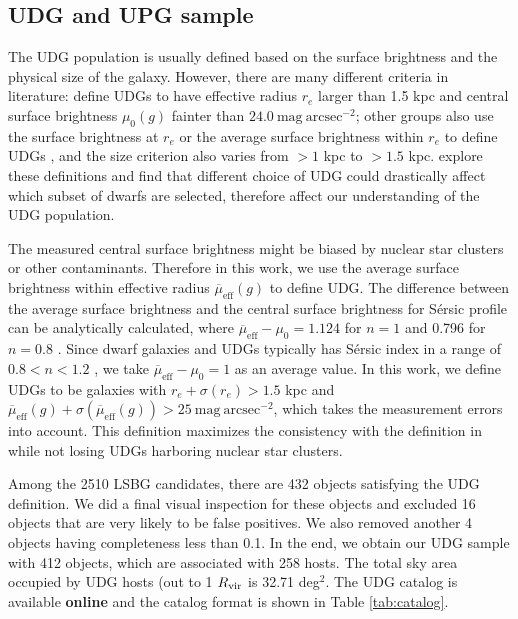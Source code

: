 \documentclass[twocolumn,astrosymb,twocolappendix]{aastex631}
\newcommand{\sbunit}{\mathrm{mag\ arcsec}^{-2}}
\newcommand{\sbeff}{\overline{\mu}_{\mathrm{eff}}(g)}
\newcommand{\sersic}{S\'ersic}
\begin{document}
\begin{CJK*}{UTF8}{gbsn}
\subsection{UDG and UPG sample}\label{sec:sample}
The UDG population is usually defined based on the surface brightness and the physical size of the galaxy. However, there are many different criteria in literature: \citep{vanDokkum2015} define UDGs to have effective radius $r_e$ larger than 1.5 kpc and central surface brightness $\mu_0(g)$ fainter than $24.0\ \sbunit$; other groups also use the surface brightness at $r_e$ \citep[e.g.,][]{DiCintio2017,Cardona-Barrero2020} or the average surface brightness within $r_e$ to define UDGs \citep[e.g.,][]{Koda2015,Yagi2016,vdBurg2016,Leisman2017,Martin2019}, and the size criterion also varies from $>1$ kpc to $>1.5$ kpc. \citet{vanNest2022} explore these definitions and find that different choice of UDG could drastically affect which subset of dwarfs are selected, therefore affect our understanding of the UDG population.

The measured central surface brightness might be biased by nuclear star clusters \citep{Neumayer2020} or other contaminants. Therefore in this work, we use the average surface brightness within effective radius $\sbeff$ to define UDG. The difference between the average surface brightness and the central surface brightness for \sersic{} profile can be analytically calculated, where $\overline{\mu}_{\mathrm{eff}} - \mu_0 = 1.124$ for $n=1$ and 0.796 for $n=0.8$ \citep{Graham2005,Yagi2016}. Since dwarf galaxies and UDGs typically has \sersic{} index in a range of $0.8 < n < 1.2$ \citep{vanDokkum2015,ELVES-I}, we take $\overline{\mu}_{\mathrm{eff}} - \mu_0 = 1$ as an average value. In this work, we define UDGs to be galaxies with $r_e+\sigma(r_e) > 1.5$ kpc and $\sbeff + \sigma(\sbeff) > 25\ \sbunit$, which takes the measurement errors into account. This definition maximizes the consistency with the definition in \citet{vanDokkum2015} while not losing UDGs harboring nuclear star clusters.

Among the 2510 LSBG candidates, there are 432 objects satisfying the UDG definition. We did a final visual inspection for these objects and excluded 16 objects that are very likely to be false positives. We also removed another 4 objects having completeness less than 0.1. In the end, we obtain our UDG sample with 412 objects, which are associated with 258 hosts. The total sky area occupied by UDG hosts (out to 1 $R_{\rm{vir}}$ is 32.71 deg$^{2}$. The UDG catalog is available \textbf{online} and the catalog format is shown in Table \ref{tab:catalog}. 


\end{CJK*}
\end{document}
